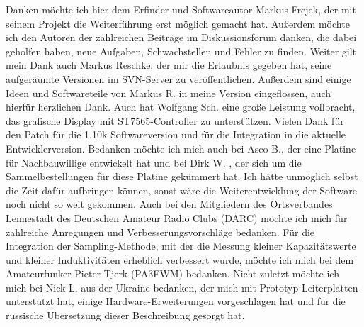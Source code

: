 Danken möchte ich hier dem Erfinder und Softwareautor Markus Frejek, der mit seinem Projekt die Weiterführung erst
möglich gemacht hat.
Außerdem möchte ich den Autoren der zahlreichen Beiträge im Diskussionsforum danken, die dabei geholfen haben, neue Aufgaben, Schwachstellen und
Fehler zu finden. 
Weiter gilt mein Dank auch Markus Reschke, der mir die Erlaubnis gegeben hat, seine aufgeräumte Versionen im
SVN-Server zu veröffentlichen. Außerdem sind einige Ideen und Softwareteile von Markus R. in meine Version eingeflossen,
auch hierfür herzlichen Dank.
Auch hat Wolfgang Sch. eine große Leistung vollbracht, das grafische Display mit ST7565-Controller zu unterstützen.
Vielen Dank für den Patch für die 1.10k Softwareversion und für die Integration in die aktuelle Entwicklerversion.
Bedanken möchte ich mich auch bei Asco B., der eine Platine für Nachbauwillige entwickelt hat und bei Dirk W. , der sich
um die Sammelbestellungen für diese Platine gekümmert hat. Ich hätte unmöglich selbst die Zeit dafür aufbringen können, sonst
wäre die Weiterentwicklung der Software noch nicht so weit gekommen.
Auch bei den Mitgliedern des Ortsverbandes Lennestadt des Deutschen Amateur Radio Clubs (DARC) möchte ich mich für zahlreiche
Anregungen und Verbesserungsvorschläge bedanken.
Für die Integration der Sampling-Methode, mit der die Messung kleiner Kapazitätswerte und kleiner Induktivitäten
erheblich verbessert wurde, möchte ich mich bei dem Amateurfunker Pieter-Tjerk (PA3FWM) bedanken.
Nicht zuletzt möchte ich mich bei Nick L. aus der Ukraine bedanken, der mich mit Prototyp-Leiterplatten unterstützt hat,
einige Hardware-Erweiterungen vorgeschlagen hat und für die russische Übersetzung dieser Beschreibung gesorgt hat.

